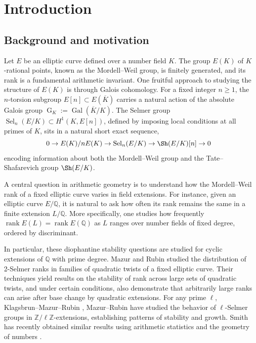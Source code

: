 \documentclass[11pt,reqno]{amsart}
\newcommand{\Q}{\mathbb{Q}}
\newcommand{\op}[1]{\operatorname{#1}}
\numberwithin{equation}{section}
\begin{document}
\subjclass[2010]{}
\keywords{}

\maketitle

\section{Introduction}
\label{section:intro}

\subsection{Background and motivation}
\par Let \( E \) be an elliptic curve defined over a number field \( K \). The group \( E(K) \) of \( K \)-rational points, known as the Mordell{--}Weil group, is finitely generated, and its rank is a fundamental arithmetic invariant. One fruitful approach to studying the structure of \( E(K) \) is through Galois cohomology. For a fixed integer \( n \geq 1 \), the \( n \)-torsion subgroup \( E[n] \subset E(\overline{K}) \) carries a natural action of the absolute Galois group \( \operatorname{G}_K := \operatorname{Gal}(\overline{K}/K) \). The Selmer group \( \operatorname{Sel}_n(E/K) \subset H^1(K, E[n]) \), defined by imposing local conditions at all primes of \( K \), sits in a natural short exact sequence,\[0\rightarrow E(K)/nE(K)\rightarrow \op{Sel}_n(E/K)\rightarrow \Sh(E/K)[n]\rightarrow 0\]
encoding information about both the Mordell{--}Weil group and the Tate{--}Shafarevich group \( \Sh(E/K) \).

\par A central question in arithmetic geometry is to understand how the Mordell{--}Weil rank of a fixed elliptic curve varies in field extensions. For instance, given an elliptic curve \( E/\mathbb{Q} \), it is natural to ask how often its rank remains the same in a finite extension \( L/\mathbb{Q} \). More specifically, one studies how frequently \( \operatorname{rank} E(L) = \operatorname{rank} E(\mathbb{Q}) \) as \( L \) ranges over number fields of fixed degree, ordered by discriminant. 

\par In particular, these diophantine stability questions are studied for cyclic extensions of $\Q$ with prime degree. Mazur and Rubin \cite{MazurRubinQtwists} studied the distribution of 2-Selmer ranks in families of quadratic twists of a fixed elliptic curve. Their techniques yield results on the stability of rank across large sets of quadratic twists, and under certain conditions, also demonstrate that arbitrarily large ranks can arise after base change by quadratic extensions. For any prime \( \ell \), Klagsbrun--Mazur--Rubin \cite{KMR}, Mazur--Rubin \cite{mazur2018diophantine} have studied the behavior of \( \ell \)-Selmer groups in \( \mathbb{Z}/\ell\mathbb{Z} \)-extensions, establishing patterns of stability and growth. Smith has recently obtained similar results using arithmetic statistics and the geometry of numbers \cite{smith2022distribution1, smith2022distribution2}. 
\end{document}
